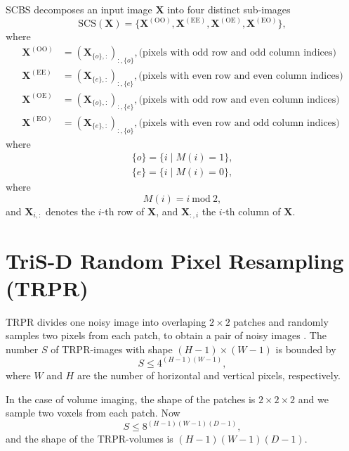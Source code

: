 \begin{subappendices}
\gls{SCBS} \cite{koho2019fourier} decomposes an input image $\mathbf{X}$
into four distinct sub-images
\begin{equation}
  \mathrm{SCS}(\mathbf{X}) = \{\mathbf{X}^{(\text{OO})}, \mathbf{X}^{(\text{EE})}, \mathbf{X}^{(\text{OE})}, \mathbf{X}^{(\text{EO})} \},
\end{equation}
where
\begin{align}
  \mathbf{X}^{(\text{OO})} & = (\mathbf{X}_{\{o\},:})_{:,\{o\}}, \text{(pixels with odd row and odd column indices)} \\
  \mathbf{X}^{(\text{EE})} & = (\mathbf{X}_{\{e\},:})_{:,\{e\}}, \text{(pixels with even row and even column indices)}\\
  \mathbf{X}^{(\text{OE})} & = (\mathbf{X}_{\{o\},:})_{:,\{e\}}, \text{(pixels with odd row and even column indices)}\\
  \mathbf{X}^{(\text{EO})} & = (\mathbf{X}_{\{e\},:})_{:,\{o\}}, \text{(pixels with even row and odd column indices)}
\end{align}
where
\begin{align}
  \{o\} = \{i\mid M(i)=1\}, \\
  \{e\} = \{i\mid M(i)=0\},
\end{align}
where
\begin{equation}
  M(i) = i~\text{mod}~2,
\end{equation}
and $\mathbf{X}_{i,:}$ denotes the $i$-th row of $\mathbf{X}$, and
$\mathbf{X}_{:,i}$ the $i$-th column of $\mathbf{X}$.


\section{TriS-D Random Pixel Resampling (TRPR)}
\label{sec:TRPR}

\gls{TRPR} divides one noisy image into overlaping $2\times 2$ patches
and randomly samples two pixels from each patch, to obtain a pair of
noisy images \cite{ma2025spatiotemporal}. The number $S$ of
\gls{TRPR}-images with shape $(H-1)\times (W-1)$ is bounded by
\begin{equation}
  S \leq 4^{(H-1)(W-1)},
\end{equation}
where $W$ and $H$ are the number of horizontal and vertical pixels,
respectively.

In the case of volume imaging, the shape of the patches is
$2\times 2\times 2$ and we sample two voxels from each patch. Now
\begin{equation}
  S \leq 8^{(H-1)(W-1)(D-1)},
\end{equation}
and the shape of the \gls{TRPR}-volumes is $(H-1)(W-1)(D-1)$.


\end{subappendices}
